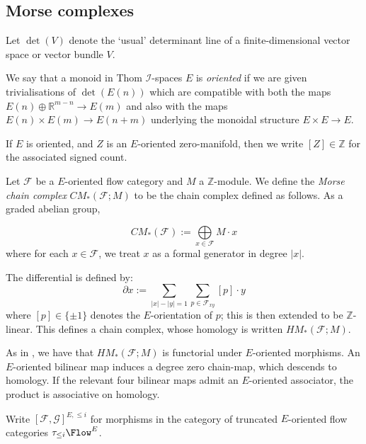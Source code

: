 \documentclass{TPmod}
\def\bR{\mathbb{R}}
\def\bZ{\mathbb{Z}}
\newcommand{\cF}{\mathcal{F}}
\newcommand{\cG}{\mathcal{G}}
\newcommand{\cI}{\mathcal{I}}
\def\bZ{\mathbb{Z}}
\numberwithin{equation}{section}
\begin{document}
  \subsection{Morse complexes}

Let $\det(V)$ denote the `usual' determinant line of a finite-dimensional vector space or vector bundle $V$. 

\begin{defn}\label{defn:Thom is oriented}
    We say that a monoid in Thom $\cI$-spaces $E$ is \emph{oriented} if we are given trivialisations of $\det(E(n))$ which are compatible with both the maps $E(n) \oplus \bR^{m-n} \to E(m)$ and also with the  maps $E(n) \times E(m) \to E(n+m)$ underlying the monoidal structure  $E\times E \to E$. 
\end{defn}




If $E$ is oriented, and $Z$ is an $E$-oriented zero-manifold, then we write $[Z] \in \bZ$ for the associated signed count.  
  

    Let $\cF$ be a $E$-oriented flow category and $M$ a $\bZ$-module.  We define the \emph{Morse chain complex} $CM_*(\cF;M)$ to be the chain complex defined as follows. As a graded abelian group,

        \begin{equation}
            CM_*(\cF) := \bigoplus\limits_{x \in \cF} M \cdot x
        \end{equation}
        where for each $x \in \cF$, we treat $x$ as a formal generator in degree $|x|$.

        The differential is defined by:
        \begin{equation}
            \partial x := \sum\limits_{|x|-|y|=1} \sum\limits_{p \in \cF_{xy}} [p] \cdot y
        \end{equation}
        where $[p] \in \{\pm 1\}$ denotes the $E$-orientation of $p$; this is then  extended to be $\bZ$-linear. This defines a chain complex, whose homology is written $HM_*(\cF;M)$.

As in \cite{PS2}, we have that $HM_*(\cF;M)$ is functorial under $E$-oriented morphisms. An $E$-oriented bilinear map induces a degree zero chain-map, which descends to homology. If the relevant four bilinear maps admit an $E$-oriented associator, the product is associative on homology. 

Write $[\cF,\cG]^{E,\leq i}$ for morphisms in the category of truncated $E$-oriented flow categories $\tau_{\leq i}\Flow^E$.
\end{document}

